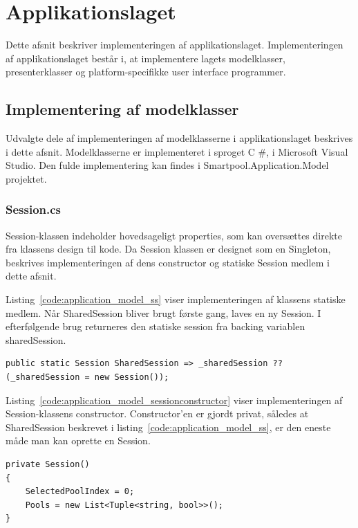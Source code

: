 \section{Applikationslaget}
Dette afsnit beskriver implementeringen af applikationslaget. Implementeringen af applikationslaget består i, at implementere lagets modelklasser, presenterklasser og platform-specifikke user interface programmer. 

\subsection{Implementering af modelklasser}
Udvalgte dele af implementeringen af modelklasserne i applikationslaget beskrives i dette afsnit. Modelklasserne er implementeret i sproget C \#, i Microsoft Visual Studio. Den fulde implementering kan findes i Smartpool.Application.Model projektet.

\subsubsection{Session.cs}
Session-klassen indeholder hovedsageligt properties, som kan oversættes direkte fra klassens design til kode. Da Session klassen er designet som en Singleton, beskrives implementeringen af dens constructor og statiske Session medlem i dette afsnit.

Listing~\ref{code:application_model_ss} viser implementeringen af klassens statiske medlem. Når SharedSession bliver brugt første gang, laves en ny Session. I efterfølgende brug returneres den statiske session fra backing variablen sharedSession.

\begin{lstlisting}[caption={SharedSession},label={code:application_model_ss}]
public static Session SharedSession => _sharedSession ?? (_sharedSession = new Session());
\end{lstlisting}

Listing~\ref{code:application_model_sessionconstructor} viser implementeringen af Session-klassens constructor. Constructor'en er gjordt privat, således at SharedSession beskrevet i listing~\ref{code:application_model_ss}, er den eneste måde man kan oprette en Session.

\begin{lstlisting}[caption={Session constructor},label={code:application_model_sessionconstructor}]
private Session()
{
	SelectedPoolIndex = 0;
	Pools = new List<Tuple<string, bool>>();
}
\end{lstlisting}


